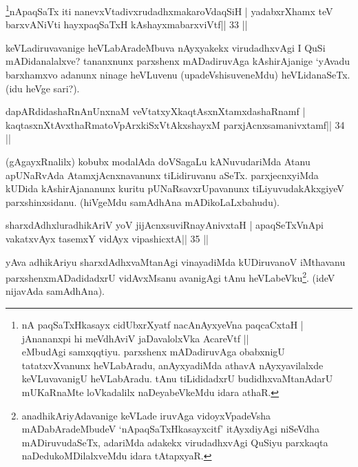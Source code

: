 
\begin{shl}
\footnote{nA paqSaTxHkasayx cidUbxrXyatf nacAnAyxyeVna paqcaCxtaH |\\ jAnananxpi hi meVdhAviV jaDavalolxVka AcareVtf ||\\ eMbudAgi samxqqtiyu. parxshenx mADadiruvAga obabxnigU tatatxvXvanunx heVLabAradu, anAyxyadiMda athavA nAyxyavilalxde keVLuvavanigU heVLabAradu. tAnu tiLididadxrU budidhxvaMtanAdarU mUKaRnaMte loVkadalilx naDeyabeVkeMdu idara athaR.}nApaqSaTx iti nanevxVtadivxrudadhxmakaroVdaqSiH |
yadabxrXhamx teV barxvANiVti hayxpaqSaTxH kAshayxmabarxviVtf\hfill || 33 ||
\end{shl}

\begin{artha}
keVLadiruvavanige heVLabAradeMbuva nAyxyakekx virudadhxvAgi I QuSi mADidanalalxve? tananxnunx parxshenx mADadiruvAga kAshirAjanige `yAvadu barxhamxvo adanunx ninage heVLuvenu (upadeVshisuveneMdu) heVLidanaSeTx. (idu heVge sari?).
\end{artha}


\begin{shl}
dapARdidashaRnAnUnxnaM veVtatxyXkaqtAsxnXtamxdashaRnamf |
kaqtasxnXtAvxthaRmatoV\s pArxkiSxVtAkxshayxM parxjAcnxsamanivxtamf\hfill || 34 ||
\end{shl}

\begin{artha}
(gAgayxRnalilx) kobubx modalAda doVSagaLu kANuvudariMda Atanu apUNaRvAda AtamxjAcnxnavanunx tiLidiruvanu aSeTx. parxjecnxyiMda kUDida kAshirAjananunx kuritu pUNaRsavxrUpavanunx tiLiyuvudakAkxgiyeV parxshinxsidanu. (hiVgeMdu samAdhAna mADikoLaLxbahudu). 
\end{artha}


\begin{shl}
sharxdAdhxluradhikAriV yoV jijAcnxsuviRnayAnivxtaH |
apaqSeTxVnApi vakatxvAyx tasemxY vidAyx vipashicxtA\hfill || 35 ||
\end{shl}

\begin{artha}
yAva adhikAriyu sharxdAdhxvaMtanAgi vinayadiMda kUDiruvanoV iMthavanu  parxshenxmADadidadxrU vidAvxMsanu avanigAgi tAnu heVLabeVku\footnote{anadhikAriyAdavanige keVLade iruvAga vidoyxVpadeVsha mADabAradeMbudeV `nApaqSaTxHkasayxcitf' itAyxdiyAgi niSeVdha mADiruvudaSeTx, adariMda adakekx virudadhxvAgi QuSiyu parxkaqta naDedukoMDilalxveMdu idara tAtapxyaR.}. (ideV nijavAda samAdhAna).
\end{artha}

